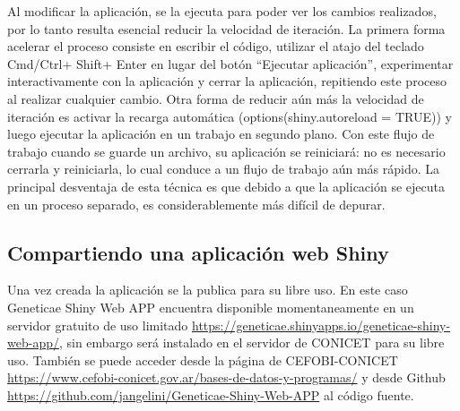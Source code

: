 Al modificar la aplicación, se la ejecuta para poder ver los cambios realizados, por lo tanto resulta esencial reducir la velocidad de iteración. La primera forma acelerar el proceso consiste en escribir el código, utilizar el atajo del teclado Cmd/Ctrl+ Shift+ Enter en lugar del botón ``Ejecutar aplicación'', experimentar interactivamente con la aplicación y cerrar la aplicación, repitiendo este proceso al realizar cualquier cambio. Otra forma de reducir aún más la velocidad de iteración es activar la recarga automática (options(shiny.autoreload = TRUE)) y luego ejecutar la aplicación en un trabajo en segundo plano. Con este flujo de trabajo cuando se guarde un archivo, su aplicación se reiniciará: no es necesario cerrarla y reiniciarla, lo cual conduce a un flujo de trabajo aún más rápido. La principal desventaja de esta técnica es que debido a que la aplicación se ejecuta en un proceso separado, es considerablemente más difícil de depurar.


\subsection{Compartiendo una aplicación web Shiny}

Una vez creada la aplicación se la publica para su libre uso. En este caso Geneticae Shiny Web APP encuentra disponible momentaneamente en un servidor gratuito de uso limitado \url{https://geneticae.shinyapps.io/geneticae-shiny-web-app/}, sin embargo será instalado en el servidor de CONICET para su libre uso. También se puede acceder desde la página de CEFOBI-CONICET \url{https://www.cefobi-conicet.gov.ar/bases-de-datos-y-programas/} y desde Github \url{https://github.com/jangelini/Geneticae-Shiny-Web-APP} al código fuente.
